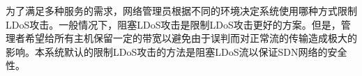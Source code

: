 
为了满足多种服务的需求，网络管理员根据不同的环境决定系统使用哪种方式限制LDoS攻击。一般情况下，阻塞LDoS攻击是限制LDoS攻击更好的方案。但是，管理者希望给所有主机保留一定的带宽以避免由于误判而对正常流的传输造成极大的影响。本系统默认的限制LDoS攻击的方法是阻塞LDoS流以保证SDN网络的安全性。


